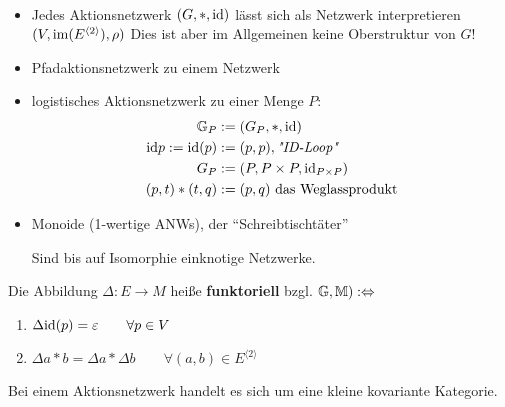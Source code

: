 \begin{beispiel}\
\begin{itemize}
\item Jedes Aktionsnetzwerk $(G, \ast, \text{id})$ lässt sich als Netzwerk interpretieren \\$(V, \operatorname{im}(E^{\langle 2 \rangle}), \rho)$
Dies ist aber im Allgemeinen keine Oberstruktur von $G$!
\item Pfadaktionsnetzwerk zu einem Netzwerk
\item logistisches Aktionsnetzwerk zu einer Menge $P$:
\begin{align*}
\mathbb{G}_P&:=(G_P,\ast,\text{id})\\
\text{id} p:=\text{id}(p)&:=(p,p), \textit{"ID-Loop"}\\
G_P&:=(P,P\times P,\text{id}_{P\times P})\\
(p,t)\ast(t,q)&:=(p,q)\text{ das Weglassprodukt}
\end{align*}
\item Monoide (1-wertige ANWs), der ``Schreibtischtäter''

Sind bis auf Isomorphie einknotige Netzwerke.
\end{itemize}
\end{beispiel}

Die Abbildung $\Delta:E\to M$ heiße \textbf{funktoriell} bzgl. $\mathbb{G},\mathbb{M}):\Leftrightarrow$ 
\begin{enumerate}
\item $\Delta \text{id}(p)=\varepsilon\qquad\forall p\in V$
\item $\Delta a\ast b=\Delta a\ast\Delta b\qquad\forall(a,b)\in E^{\langle2\rangle}$
\end{enumerate}


\begin{bemerkung}
    Bei einem Aktionsnetzwerk handelt es sich um eine kleine kovariante Kategorie.
\end{bemerkung}

